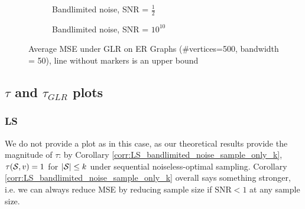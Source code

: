 \begin{figure}
\begin{subfigure}{0.3\columnwidth}
    \caption{Bandlimited noise, SNR = $\frac{1}{2}$}%
    \label{bandlimited_GLR_MSE_subfigb}%
    \end{subfigure}\hfill%
    \begin{subfigure}{0.3\columnwidth}
    \caption{Bandlimited noise, SNR = $10^{10}$}%
    \label{bandlimited_GLR_MSE_subfigc}%
    \end{subfigure}%
    \caption{Average MSE under GLR on ER Graphs (\#vertices=500, bandwidth = 50), line without markers is an upper bound}
\label{GLR_ER_MSE_fig_bl}
\end{figure}

\subsection{\texorpdfstring{$\tau$ and $\tau_{GLR}$ plots}{\texttau and \texttau\_GLR plots}}

\subsubsection{LS}
We do not provide a plot as in this case, as our theoretical results provide the magnitude of $\tau$: by Corollary \ref {corr:LS_bandlimited_noise_sample_only_k}, $\tau(\mathcal{S},v) = 1$ for $|\mathcal{S}| \leq k$ under sequential noiseless-optimal sampling. Corollary \ref{corr:LS_bandlimited_noise_sample_only_k} overall says something stronger, i.e. we can always reduce MSE by reducing sample size if $\text{SNR} < 1$ at any sample size.

